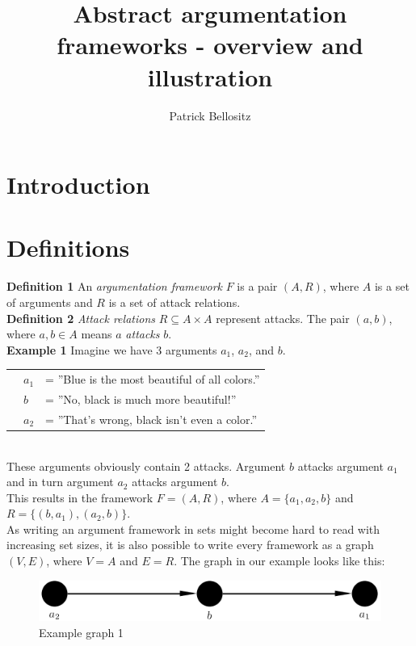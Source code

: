 \documentclass{article}
\newcommand{\nl}{\\[6pt]}
\newcommand{\dl}{\\[12pt]}
\begin{document}
\title{Abstract argumentation frameworks - overview and illustration}
\author{Patrick Bellositz}
\date{}
\maketitle

\section{Introduction}

\section{Definitions}
\textbf{Definition 1} An \emph{argumentation framework} $F$ is a pair $(A,R)$, where $A$ is a set of arguments and $R$ is a set of attack relations.\dl
\textbf{Definition 2} \emph{Attack relations} $R\subseteq A\times A$ represent attacks. The pair $(a,b)$, where $a,b\in A$ means $a$ \emph{attacks} $b$.\dl
\textbf{Example 1} Imagine we have 3 arguments $a_1$, $a_2$, and $b$.\nl
			\begin{tabular}{p{0.5cm}p{0.5cm}l}
			& $a_1$ & = ''Blue is the most beautiful of all colors.''\\
			& $b$ & = ''No, black is much more beautiful!''\\
			& $a_2$ & = ''That's wrong, black isn't even a color.''
			\end{tabular}\nl
These arguments obviously contain 2 attacks. Argument $b$ attacks argument $a_1$ and in turn argument $a_2$ attacks argument $b$.\nl
This results in the framework $F=(A,R)$, where $A=\{a_1,a_2,b\}$ and $R=\{(b,a_1),(a_2,b)\}$.\dl
As writing an argument framework in sets might become hard to read with increasing set sizes, it is also possible to write every framework as a graph $(V,E)$, where $V=A$ and $E=R$. The graph in our example looks like this:\dl

\FloatBarrier
	\begin{figure}[h]
		\centering
		\includegraphics[width=\linewidth]{graphs/ex1.png} %
		\caption{Example graph 1}
	\end{figure}
\FloatBarrier
\end{document}
